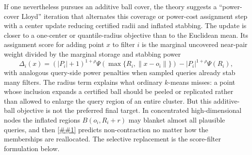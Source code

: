 \documentclass[10pt]{article}
\newcommand{\cref}[1]{\ref{##1}}
\theoremstyle{definition}
\begin{document}
If one nevertheless pursues an additive ball cover, the theory suggests a
``power-cover Lloyd'' iteration that alternates this coverage or power-cost
assignment step with a center update reducing certified radii and inflated
stabbing.  The update is closer to a one-center or quantile-radius objective
than to the Euclidean mean.  Its assignment score for adding point $x$ to
filter $i$ is the marginal uncovered near-pair weight divided by the marginal
storage and stabbing power
\[
   \Delta_i(x)
   =
   (|P_i|+1)^{1+\rho}
   \Psi\!\left(\max\{R_i,\|x-o_i\|\}\right)
   -
   |P_i|^{1+\rho}\Psi(R_i),
\]
with analogous query-side power penalties when sampled queries already stab
many filters.  The radius term explains what ordinary $k$-means misses: a point
whose inclusion expands a certified ball should be peeled or replicated rather
than allowed to enlarge the query region of an entire cluster.  But this
additive-ball objective is not the preferred final target.  In concentrated
high-dimensional nodes the inflated regions $B(o_i,R_i+r)$ may blanket almost
all plausible queries, and then \cref{lem:balanced-fanout-obstruction} predicts
non-contraction no matter how the memberships are reallocated.  The selective
replacement is the score-filter formulation below.
\end{document}
